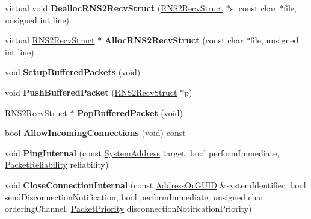 \begin{DoxyCompactItemize}
\item 
\hypertarget{class_rak_net_1_1_rak_peer_aa063f6cae7f7a7931ce5e7316099e2aa}{virtual void {\bfseries Dealloc\-R\-N\-S2\-Recv\-Struct} (\hyperlink{struct_rak_net_1_1_r_n_s2_recv_struct}{R\-N\-S2\-Recv\-Struct} $\ast$s, const char $\ast$file, unsigned int line)}\label{class_rak_net_1_1_rak_peer_aa063f6cae7f7a7931ce5e7316099e2aa}

\item 
\hypertarget{class_rak_net_1_1_rak_peer_a105df3fb67bbc363ec860dfbd531d99c}{virtual \hyperlink{struct_rak_net_1_1_r_n_s2_recv_struct}{R\-N\-S2\-Recv\-Struct} $\ast$ {\bfseries Alloc\-R\-N\-S2\-Recv\-Struct} (const char $\ast$file, unsigned int line)}\label{class_rak_net_1_1_rak_peer_a105df3fb67bbc363ec860dfbd531d99c}

\item 
\hypertarget{class_rak_net_1_1_rak_peer_acb71b37630663a3e513d905ec0713eb6}{void {\bfseries Setup\-Buffered\-Packets} (void)}\label{class_rak_net_1_1_rak_peer_acb71b37630663a3e513d905ec0713eb6}

\item 
\hypertarget{class_rak_net_1_1_rak_peer_a077f424d8b585d32e4cf6ae069328f69}{void {\bfseries Push\-Buffered\-Packet} (\hyperlink{struct_rak_net_1_1_r_n_s2_recv_struct}{R\-N\-S2\-Recv\-Struct} $\ast$p)}\label{class_rak_net_1_1_rak_peer_a077f424d8b585d32e4cf6ae069328f69}

\item 
\hypertarget{class_rak_net_1_1_rak_peer_aeefe7f56e50503b7cfd07f3a4638d621}{\hyperlink{struct_rak_net_1_1_r_n_s2_recv_struct}{R\-N\-S2\-Recv\-Struct} $\ast$ {\bfseries Pop\-Buffered\-Packet} (void)}\label{class_rak_net_1_1_rak_peer_aeefe7f56e50503b7cfd07f3a4638d621}

\item 
\hypertarget{class_rak_net_1_1_rak_peer_a270da3e2ae69c2e1cdbdb59c44a4fd9b}{bool {\bfseries Allow\-Incoming\-Connections} (void) const }\label{class_rak_net_1_1_rak_peer_a270da3e2ae69c2e1cdbdb59c44a4fd9b}

\item 
\hypertarget{class_rak_net_1_1_rak_peer_a3cd5f699630906a2e2c5b3a4932aa951}{void {\bfseries Ping\-Internal} (const \hyperlink{struct_rak_net_1_1_system_address}{System\-Address} target, bool perform\-Immediate, \hyperlink{_packet_priority_8h_ae41fa01235e99dced384d137fa874a7e}{Packet\-Reliability} reliability)}\label{class_rak_net_1_1_rak_peer_a3cd5f699630906a2e2c5b3a4932aa951}

\item 
\hypertarget{class_rak_net_1_1_rak_peer_aaa5659d40f5095c0934012e08795565a}{void {\bfseries Close\-Connection\-Internal} (const \hyperlink{struct_rak_net_1_1_address_or_g_u_i_d}{Address\-Or\-G\-U\-I\-D} \&system\-Identifier, bool send\-Disconnection\-Notification, bool perform\-Immediate, unsigned char ordering\-Channel, \hyperlink{_packet_priority_8h_a659378374e516180f93640c79f59705c}{Packet\-Priority} disconnection\-Notification\-Priority)}\label{class_rak_net_1_1_rak_peer_aaa5659d40f5095c0934012e08795565a}


\end{DoxyCompactItemize}
